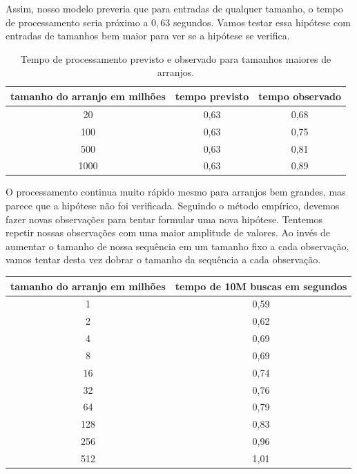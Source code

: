 Assim, nosso modelo preveria que para entradas de qualquer tamanho, o tempo de processamento seria próximo a $0,63$ segundos.
Vamos testar essa hipótese com entradas de tamanhos bem maior para ver se a hipótese se verifica.

\begin{table}
  \label{tab:verificacao}
  \begin{tabular}{|c|c|c|}
    \hline
    tamanho do arranjo em milhões & tempo previsto & tempo observado \\
    \hline 
    20                            & 0,63           & 0,68            \\
    100                           & 0,63           & 0,75            \\
    500                           & 0,63           & 0,81            \\
    1000                          & 0,63           & 0,89            \\
    \hline
  \end{tabular}
  \caption{Tempo de processamento previsto e observado para tamanhos maiores de arranjos.}
\end{table}

O processamento continua muito rápido mesmo para arranjos bem grandes, mas parece que a hipótese não foi verificada.
Seguindo o método empírico, devemos fazer novas observações para tentar formular uma nova hipótese.
Tentemos repetir nossas observações com uma maior amplitude de valores.
Ao invés de aumentar o tamanho de nossa sequência em um tamanho fixo a cada observação, vamos tentar desta vez dobrar o tamanho da sequência a cada observação.


\begin{table}
  \label{tab:observacao4}
  \begin{tabular}{|c|c|}
    \hline
    tamanho do arranjo em milhões & tempo de 10M buscas em segundos \\
    \hline 
    1                             & 0,59                            \\
    2                             & 0,62                            \\
    4                             & 0,69                            \\
    8                             & 0,69                            \\
    16                            & 0,74                            \\
    32                            & 0,76                            \\
    64                            & 0,79                            \\
    128                           & 0,83                            \\
    256                           & 0,96                            \\
    512                           & 1,01                            \\
    \hline
  \end{tabular}
\end{table}

